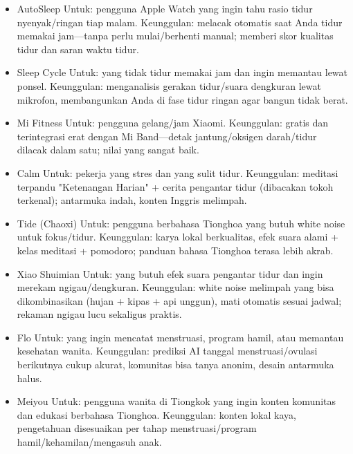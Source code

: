 
\begin{itemize}
  \item AutoSleep Untuk: pengguna Apple Watch yang ingin tahu rasio tidur nyenyak/ringan tiap malam. Keunggulan: melacak otomatis saat Anda tidur memakai jam—tanpa perlu mulai/berhenti manual; memberi skor kualitas tidur dan saran waktu tidur.
  \item Sleep Cycle Untuk: yang tidak tidur memakai jam dan ingin memantau lewat ponsel. Keunggulan: menganalisis gerakan tidur/suara dengkuran lewat mikrofon, membangunkan Anda di fase tidur ringan agar bangun tidak berat.
  \item Mi Fitness Untuk: pengguna gelang/jam Xiaomi. Keunggulan: gratis dan terintegrasi erat dengan Mi Band—detak jantung/oksigen darah/tidur dilacak dalam satu; nilai yang sangat baik.
\end{itemize}


\begin{itemize}
  \item Calm Untuk: pekerja yang stres dan yang sulit tidur. Keunggulan: meditasi terpandu "Ketenangan Harian" + cerita pengantar tidur (dibacakan tokoh terkenal); antarmuka indah, konten Inggris melimpah.
  \item Tide (Chaoxi) Untuk: pengguna berbahasa Tionghoa yang butuh white noise untuk fokus/tidur. Keunggulan: karya lokal berkualitas, efek suara alami + kelas meditasi + pomodoro; panduan bahasa Tionghoa terasa lebih akrab.
  \item Xiao Shuimian Untuk: yang butuh efek suara pengantar tidur dan ingin merekam ngigau/dengkuran. Keunggulan: white noise melimpah yang bisa dikombinasikan (hujan + kipas + api unggun), mati otomatis sesuai jadwal; rekaman ngigau lucu sekaligus praktis.
\end{itemize}


\begin{itemize}
  \item Flo Untuk: yang ingin mencatat menstruasi, program hamil, atau memantau kesehatan wanita. Keunggulan: prediksi AI tanggal menstruasi/ovulasi berikutnya cukup akurat, komunitas bisa tanya anonim, desain antarmuka halus.
  \item Meiyou Untuk: pengguna wanita di Tiongkok yang ingin konten komunitas dan edukasi berbahasa Tionghoa. Keunggulan: konten lokal kaya, pengetahuan disesuaikan per tahap menstruasi/program hamil/kehamilan/mengasuh anak.
\end{itemize}

